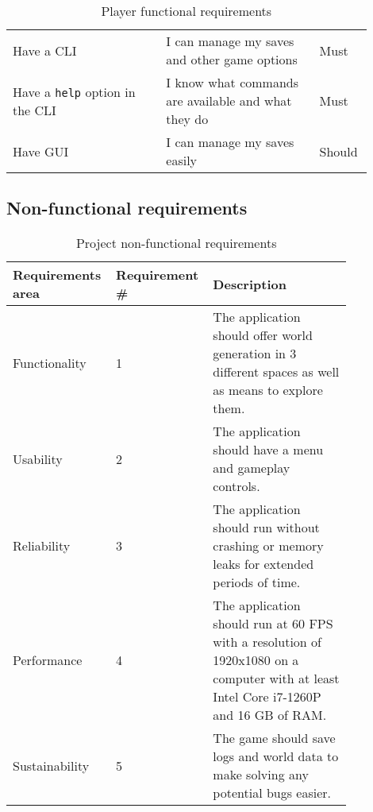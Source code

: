 \documentclass[12pt]{article}
\begin{document}
\begin{table}[H]
\begin{tabular}{p{0.4\linewidth}|p{0.4\linewidth}|p{0.1\linewidth}}
        Have a CLI                                                & I can manage my saves and other game options                       & Must           \\
        Have a \texttt{help} option in the CLI                    & I know what commands are available and what they do                & Must           \\
        Have GUI                                                  & I can manage my saves easily                                       & Should         \\ \hline
    \end{tabular}
    \caption{Player functional requirements}
\end{table}

\subsection{Non-functional requirements}

\begin{table}[H]
    \begin{tabular}{|p{0.25\linewidth}|p{0.2\linewidth}|p{0.4\linewidth}|}
        \hline
        \textbf{Requirements area} & \textbf{Requirement \#} & \textbf{Description}                                                                                                                  \\ \hline
        Functionality              & 1                       & The application should offer world generation in 3 different spaces as well as means to explore them.                                 \\ \hline
        Usability                  & 2                       & The application should have a menu and gameplay controls.                                                                             \\ \hline
        Reliability                & 3                       & The application should run without crashing or memory leaks for extended periods of time.                                             \\ \hline
        Performance                & 4                       & The application should run at 60 FPS with a resolution of 1920x1080 on a computer with at least Intel Core i7-1260P and 16 GB of RAM. \\ \hline
        Sustainability             & 5                       & The game should save logs and world data to make solving any potential bugs easier.                                                   \\ \hline
    \end{tabular}
    \caption{Project non-functional requirements}
\end{table}
\end{document}
